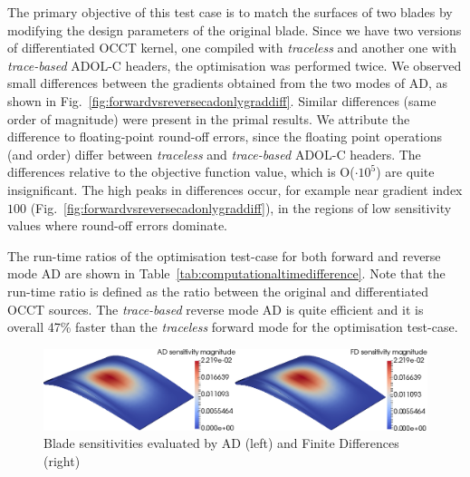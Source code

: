 \documentclass[9pt,academicons]{article}
\begin{document}
The primary objective of this test case is to match the surfaces of two blades by modifying the design parameters of the original blade. Since we have two versions of differentiated OCCT kernel, one compiled with \textit{traceless} and another one with \textit{trace-based} ADOL-C headers, the optimisation was performed twice.
We observed small differences between the gradients obtained from the two modes of AD, as shown in Fig.~\ref{fig:forwardvsreversecadonlygraddiff}.
Similar differences (same order of magnitude) were present in the primal results. We attribute the difference to floating-point round-off errors, since the floating point operations (and order) differ between \textit{traceless} and \textit{trace-based} ADOL-C headers. The differences relative to the objective function value, which is O($\cdot10^5$) are quite insignificant. The high peaks in differences occur, for example near gradient index $100$ (Fig.~\ref{fig:forwardvsreversecadonlygraddiff}), in the regions of low sensitivity values where round-off errors dominate.

The run-time ratios of the optimisation test-case for both forward and reverse mode AD are shown in Table~\ref{tab:computationaltimedifference}. Note that the run-time ratio is defined as the ratio between the original and differentiated OCCT sources. The \textit{trace-based} reverse mode AD is quite efficient and it is overall 47\% faster than the \textit{traceless} forward mode for the optimisation test-case.

\begin{figure}[h!]
 \begin{center}
  \includegraphics[scale=0.35]{img/ADvsFDparam150.png}
  \caption{Blade sensitivities evaluated by AD (left) and Finite Differences (right)}
  \label{fig:adfdsensitivity}
 \end{center}
\end{figure}
\end{document}
